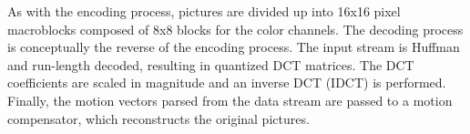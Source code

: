 As with the encoding process, pictures are divided up into 16x16 pixel
macroblocks composed of 8x8 blocks for the color channels. 
The decoding process is conceptually the reverse of the encoding
process. The input stream is Huffman and run-length decoded, resulting
in quantized DCT matrices. The DCT coefficients are scaled in
magnitude and an inverse DCT (IDCT) is performed.
Finally, the motion vectors parsed from the data stream are passed to
a motion compensator, which reconstructs the original pictures. 
